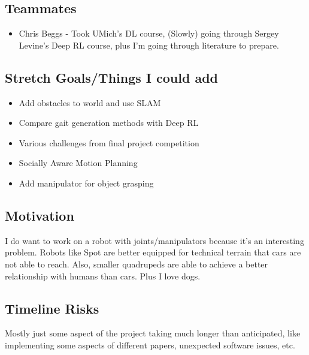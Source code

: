 \documentclass{article}
\theoremstyle{definition}
\theoremstyle{note}
\begin{document}
\subsection*{Teammates}
\begin{itemize}
    \item Chris Beggs - Took UMich's DL course, (Slowly) going through Sergey Levine's Deep RL course, plus I'm going through literature to prepare.
\end{itemize}

\subsection*{Stretch Goals/Things I could add}
\begin{itemize}
\item Add obstacles to world and use SLAM
\item Compare gait generation methods with Deep RL
\item Various challenges from final project competition
\item Socially Aware Motion Planning
\item Add manipulator for object grasping 
\end{itemize}


\subsection*{Motivation}
I do want to work on a robot with joints/manipulators because it's an interesting problem.
Robots like Spot are better equipped for technical terrain that cars are not able to reach. Also, 
smaller quadrupeds are able to achieve a better relationship with humans than cars.
Plus I love dogs.

\subsection*{Timeline Risks}
Mostly just some aspect of the project taking much longer than anticipated, like implementing some aspects
of different papers, unexpected software issues, etc.
\end{document}
